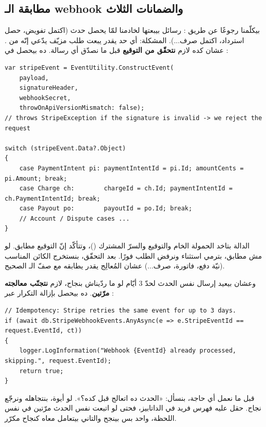 \subsection{مطابقة الـ webhook والضمانات الثلاث}

 بيكلّمنا رجوعًا عن طريق : رسائل  بيبعتها لخادمنا
لمّا يحصل حدث (اكتمل تفويض، حصل استرداد، اكتمل صرف...). المشكلة: أي حد يقدر يبعت
طلب  مزيّف يدّعي إنّه من . عشان كده لازم \textbf{نتحقّق من
التوقيع} قبل ما نصدّق أي رسالة. ده بيحصل في :

\begin{english}
\begin{lstlisting}[language={[Sharp]C}]
var stripeEvent = EventUtility.ConstructEvent(
    payload,
    signatureHeader,
    webhookSecret,
    throwOnApiVersionMismatch: false);
// throws StripeException if the signature is invalid -> we reject the request

switch (stripeEvent.Data?.Object)
{
    case PaymentIntent pi: paymentIntentId = pi.Id; amountCents = pi.Amount; break;
    case Charge ch:        chargeId = ch.Id; paymentIntentId = ch.PaymentIntentId; break;
    case Payout po:        payoutId = po.Id; break;
    // Account / Dispute cases ...
}
\end{lstlisting}
\end{english}

الدالة  بتاخد الحمولة الخام والتوقيع والسرّ
المشترك ()، وتتأكّد إنّ التوقيع مطابق. لو مش مطابق، بترمي
استثناء ونرفض الطلب فورًا. بعد التحقّق، بنستخرج الكائن المناسب (نيّة دفع، فاتورة،
صرف...) عشان المُعالِج يقدر يطابقه مع صفّ الـ  الصحيح.

وعشان  بيعيد إرسال نفس الحدث لحدّ 3 أيّام لو ما ردّيناش بنجاح، لازم
\textbf{نتجنّب معالجته مرّتين}. ده بيحصل بإزالة التكرار عبر
:

\begin{english}
\begin{lstlisting}[language={[Sharp]C}]
// Idempotency: Stripe retries the same event for up to 3 days.
if (await db.StripeWebhookEvents.AnyAsync(e => e.StripeEventId == request.EventId, ct))
{
    logger.LogInformation("Webhook {EventId} already processed, skipping.", request.EventId);
    return true;
}
\end{lstlisting}
\end{english}

قبل ما نعمل أي حاجة، بنسأل: «الحدث ده اتعالج قبل كده؟». لو أيوة، بنتجاهله
ونرجّع نجاح. حقل  عليه فهرس فريد في الداتابيز، فحتى لو
اتبعت نفس الحدث مرّتين في نفس اللحظة، واحد بس بينجح والتاني بيتعامل معاه كنجاح
مكرّر.

